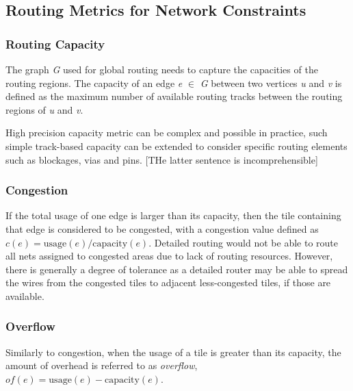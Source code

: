 \subsection{Routing Metrics for Network Constraints}
\subsubsection{Routing Capacity}
The graph \emph{G} used for global routing needs to capture the capacities of the routing regions. The capacity of an edge \emph{e} $\in$ \emph{G} between two vertices \emph{u} and \emph{v} is defined as the maximum number of available routing tracks between the routing regions of \emph{u} and \emph{v}. 

High precision capacity metric can be complex and possible in practice, such simple track-based capacity can be extended  to consider specific routing elements such as blockages, vias and pins. [THe latter sentence is incomprehensible]
\subsubsection{Congestion}
If the total usage of one edge is larger than its capacity, then the tile containing that edge is considered to be congested, with a congestion value defined as $c(e)=\text{usage}(e)/\text{capacity}(e)$. Detailed routing would not be able to route all nets assigned to congested areas due to lack of routing resources. However, there is generally a degree of tolerance as a detailed router may be able to spread the wires from the congested tiles to adjacent less-congested tiles, if those are available.
\subsubsection{Overflow}
Similarly to congestion, when the usage of a tile is greater than its capacity, the amount of overhead is referred to as {\it overflow}, $of(e)=\text{usage}(e)-\text{capacity}(e)$.

